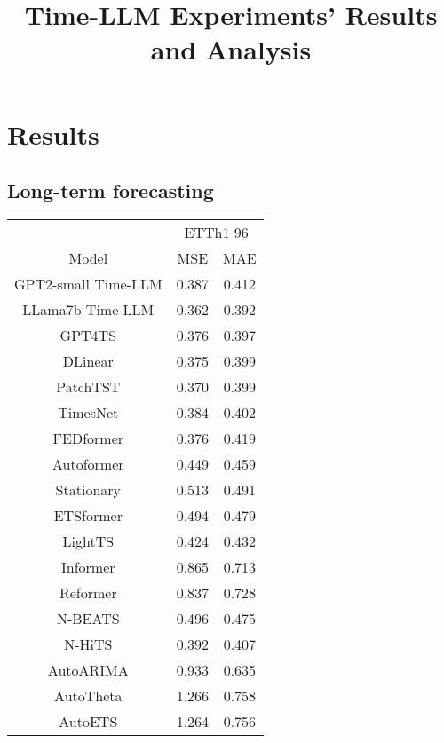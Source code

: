\documentclass[conference]{IEEEtran}
\begin{document}
\title{Time-LLM Experiments' Results and Analysis}

\maketitle



\section{Results}

\subsection{Long-term forecasting}

\begin{tabular}{|c|c|c|}
    \hline
                        & \multicolumn{2}{c|}{ETTh1 96}         \\
    \cline{2-3}
    Model               & MSE                           & MAE   \\
    \hline
    GPT2-small Time-LLM & 0.387                         & 0.412 \\
    \hline
    LLama7b Time-LLM    & 0.362                         & 0.392 \\
    GPT4TS              & 0.376                         & 0.397 \\
    DLinear             & 0.375                         & 0.399 \\
    PatchTST            & 0.370                         & 0.399 \\
    TimesNet            & 0.384                         & 0.402 \\
    FEDformer           & 0.376                         & 0.419 \\
    Autoformer          & 0.449                         & 0.459 \\
    Stationary          & 0.513                         & 0.491 \\
    ETSformer           & 0.494                         & 0.479 \\
    LightTS             & 0.424                         & 0.432 \\
    Informer            & 0.865                         & 0.713 \\
    Reformer            & 0.837                         & 0.728 \\
    N-BEATS             & 0.496                         & 0.475 \\
    N-HiTS              & 0.392                         & 0.407 \\
    AutoARIMA           & 0.933                         & 0.635 \\
    AutoTheta           & 1.266                         & 0.758 \\
    AutoETS             & 1.264                         & 0.756 \\
    \hline
\end{tabular}
\end{document}
